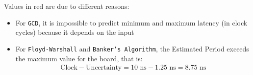 Values in red are due to different reasons:

\begin{itemize}
	\item For \texttt{GCD}, it is impossible to predict minimum and maximum latency (in clock cycles) because it depends on the input
	\item For \texttt{Floyd-Warshall} and \texttt{Banker's Algorithm}, the Estimated Period exceeds the maximum value for the board, that is:
	\begin{align*}
	\text{Clock} - \text{Uncertainty} = 10 \text{ ns} - 1.25 \text{ ns} = 8.75 \text{ ns}
	\end{align*}
\end{itemize}






